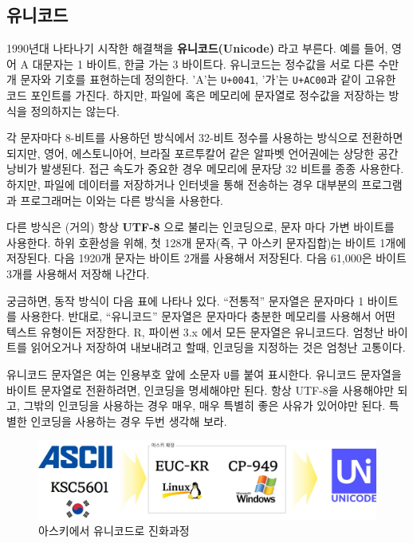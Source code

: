 \documentclass[
  letterpaper,
]{book}
\begin{document}
\hypertarget{ascii-unicode}{%
\subsection{유니코드}\label{ascii-unicode}}

1990년대 나타나기 시작한 해결책을 \textbf{유니코드(Unicode)} 라고
부른다. 예를 들어, 영어 A 대문자는 1 바이트, 한글 가는 3 바이트다.
유니코드는 정수값을 서로 다른 수만개 문자와 기호를 표현하는데 정의한다.
'A'는 \texttt{U+0041}, '가'는 \texttt{U+AC00}과 같이 고유한 코드
포인트를 가진다. 하지만, 파일에 혹은 메모리에 문자열로 정수값을 저장하는
방식을 정의하지는 않는다.

각 문자마다 8-비트를 사용하던 방식에서 32-비트 정수를 사용하는 방식으로
전환하면 되지만, 영어, 에스토니아어, 브라질 포르투칼어 같은 알파벳
언어권에는 상당한 공간 낭비가 발생된다. 접근 속도가 중요한 경우 메모리에
문자당 32 비트를 종종 사용한다. 하지만, 파일에 데이터를 저장하거나
인터넷을 통해 전송하는 경우 대부분의 프로그램과 프로그래머는 이와는 다른
방식을 사용한다.

다른 방식은 (거의) 항상 \textbf{UTF-8} 으로 불리는 인코딩으로, 문자 마다
가변 바이트를 사용한다. 하위 호환성을 위해, 첫 128개 문자(즉, 구 아스키
문자집합)는 바이트 1개에 저장된다. 다음 1920개 문자는 바이트 2개를
사용해서 저장된다. 다음 61,000은 바이트 3개를 사용해서 저장해 나간다.

궁금하면, 동작 방식이 다음 표에 나타나 있다. ``전통적'' 문자열은
문자마다 1 바이트를 사용한다. 반대로, ``유니코드'' 문자열은 문자마다
충분한 메모리를 사용해서 어떤 텍스트 유형이든 저장한다. R, 파이썬 3.x
에서 모든 문자열은 유니코드다. 엄청난 바이트를 읽어오거나 저장하여
내보내려고 할때, 인코딩을 지정하는 것은 엄청난 고통이다.

유니코드 문자열은 여는 인용부호 앞에 소문자 \texttt{U}를 붙여 표시한다.
유니코드 문자열을 바이트 문자열로 전환하려면, 인코딩을 명세해야만 된다.
항상 UTF-8을 사용해야만 되고, 그밖의 인코딩을 사용하는 경우 매우, 매우
특별히 좋은 사유가 있어야만 된다. 특별한 인코딩을 사용하는 경우 두번
생각해 보라.

\begin{figure}

{\centering \includegraphics{images/ascii_evolution.jpg}

}

\caption{아스키에서 유니코드로 진화과정}

\end{figure}
\end{document}
